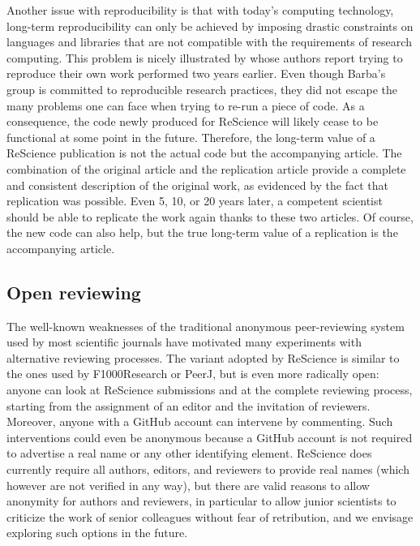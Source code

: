 \documentclass[11pt]{article}
\begin{document}
Another issue with reproducibility is that with today's computing
technology, long-term reproducibility can only be achieved by imposing
drastic constraints on languages and libraries that are not compatible
with the requirements of research computing. This problem is nicely
illustrated by \citet{Mesnard:2016} whose authors report trying to
reproduce their own work performed two years earlier. Even though
Barba's group is committed to reproducible research practices, they
did not escape the many problems one can face when trying to re-run a
piece of code. As a consequence, the code newly produced for ReScience
will likely cease to be functional at some point in the future.
Therefore, the long-term value of a ReScience publication is not the
actual code but the accompanying article. The combination of the
original article and the replication article provide a complete and
consistent description of the original work, as evidenced by the fact
that replication was possible. Even 5, 10, or 20 years later, a
competent scientist should be able to replicate the work again thanks
to these two articles. Of course, the new code can also help, but the
true long-term value of a replication is the accompanying article.\\

\subsection*{Open reviewing}

The well-known weaknesses of the traditional anonymous peer-reviewing
system used by most scientific journals have motivated many
experiments with alternative reviewing processes. The variant
adopted by ReScience is similar to the ones used by F1000Research or
PeerJ, but is even more radically open: anyone can look at ReScience
submissions and at the complete reviewing process, starting from the
assignment of an editor and the invitation of reviewers. Moreover,
anyone with a GitHub account can intervene by commenting. Such
interventions could even be anonymous because a GitHub account is not
required to advertise a real name or any other identifying
element. ReScience does currently require all authors, editors, and
reviewers to provide real names (which however are not verified in any
way), but there are valid reasons to allow anonymity for authors and
reviewers, in particular to allow junior scientists to criticize the
work of senior colleagues without fear of retribution, and we envisage
exploring such options in the future.
\end{document}

